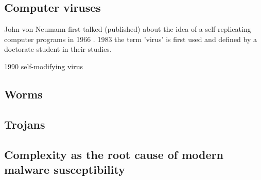 \subsection{Computer viruses}
John von Neumann first talked (published) about the idea of a self-replicating computer programs in 1966 \cite{neumann}. 1983 the term 'virus' is first used and defined by a doctorate student in their studies. 

1990 self-modifying virus

\subsection{Worms}


\subsection{Trojans}


\subsection{Complexity as the root cause of modern malware susceptibility}